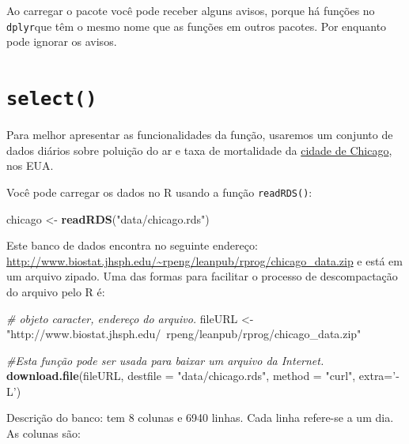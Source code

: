 \documentclass[a4paper]{book}
\newenvironment{Shaded}{\begin{snugshade}}{\end{snugshade}}
\newcommand{\CommentTok}[1]{\textcolor[rgb]{0.56,0.35,0.01}{\textit{#1}}}
\newcommand{\DataTypeTok}[1]{\textcolor[rgb]{0.13,0.29,0.53}{#1}}
\newcommand{\KeywordTok}[1]{\textcolor[rgb]{0.13,0.29,0.53}{\textbf{#1}}}
\newcommand{\NormalTok}[1]{#1}
\newcommand{\StringTok}[1]{\textcolor[rgb]{0.31,0.60,0.02}{#1}}
\begin{document}
Ao carregar o pacote você pode receber alguns avisos, porque há funções no \texttt{dplyr}que têm o mesmo nome que as funções em outros pacotes. Por enquanto pode ignorar os avisos.

\hypertarget{select}{%
\section{\texorpdfstring{\texttt{select()}}{select()}}\label{select}}

Para melhor apresentar as funcionalidades da função, usaremos um conjunto de dados diários sobre poluição do ar e taxa de mortalidade da \href{http://www.biostat.jhsph.edu/~rpeng/leanpub/rprog/chicago_data.zip}{cidade de Chicago}, nos EUA.

Você pode carregar os dados no R usando a função \texttt{readRDS()}:

\begin{Shaded}
\begin{Highlighting}[]
\NormalTok{chicago <-}\StringTok{ }\KeywordTok{readRDS}\NormalTok{(}\StringTok{"data/chicago.rds"}\NormalTok{)}
\end{Highlighting}
\end{Shaded}

Este banco de dados encontra no seguinte endereço: \url{http://www.biostat.jhsph.edu/~rpeng/leanpub/rprog/chicago_data.zip} e está em um arquivo zipado. Uma das formas para facilitar o processo de descompactação do arquivo pelo R é:

\begin{Shaded}
\begin{Highlighting}[]
\CommentTok{# objeto caracter, endereço do arquivo.}
\NormalTok{fileURL <-}\StringTok{ "http://www.biostat.jhsph.edu/~rpeng/leanpub/rprog/chicago_data.zip"}

\CommentTok{#Esta função pode ser usada para baixar um arquivo da Internet.}
\KeywordTok{download.file}\NormalTok{(fileURL, }\DataTypeTok{destfile =} \StringTok{"data/chicago.rds"}\NormalTok{, }\DataTypeTok{method =} \StringTok{"curl"}\NormalTok{, }\DataTypeTok{extra=}\StringTok{'-L'}\NormalTok{) }
\end{Highlighting}
\end{Shaded}

Descrição do banco: tem 8 colunas e 6940 linhas. Cada linha refere-se a um dia. As colunas são:
\end{document}
